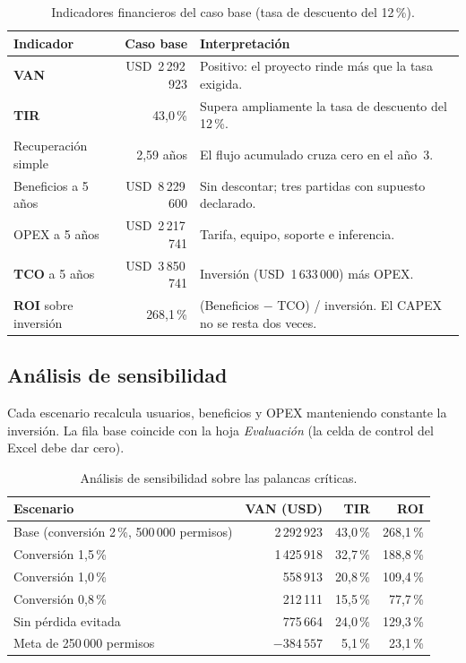 \documentclass[11pt,a4paper]{article}
\newcommand{\usd}[1]{USD~#1}
\begin{document}
\begin{table}[H]
\centering
\caption{Indicadores financieros del caso base (tasa de descuento del 12\,\%).}
\small
\begin{tabularx}{\textwidth}{@{}p{3.6cm} r X@{}}
\toprule
\textbf{Indicador} & \textbf{Caso base} & \textbf{Interpretación} \\
\midrule
\textbf{VAN} & \usd{2\,292\,923} & Positivo: el proyecto rinde más que la tasa exigida. \\
\textbf{TIR} & 43,0\,\% & Supera ampliamente la tasa de descuento del 12\,\%. \\
Recuperación simple & 2,59 años & El flujo acumulado cruza cero en el año~3. \\
Beneficios a 5 años & \usd{8\,229\,600} & Sin descontar; tres partidas con supuesto declarado. \\
OPEX a 5 años & \usd{2\,217\,741} & Tarifa, equipo, soporte e inferencia. \\
\textbf{TCO} a 5 años & \usd{3\,850\,741} & Inversión (\usd{1\,633\,000}) más OPEX. \\
\textbf{ROI} sobre inversión & 268,1\,\% & (Beneficios $-$ TCO) / inversión. El CAPEX no se resta dos veces. \\
\bottomrule
\end{tabularx}
\end{table}

\subsection{Análisis de sensibilidad}

Cada escenario recalcula usuarios, beneficios y OPEX manteniendo constante la inversión. La fila base coincide con la hoja \textit{Evaluación} (la celda de control del Excel debe dar cero).

\begin{table}[H]
\centering
\caption{Análisis de sensibilidad sobre las palancas críticas.}
\small
\begin{tabularx}{\textwidth}{@{}X r r r@{}}
\toprule
\textbf{Escenario} & \textbf{VAN (USD)} & \textbf{TIR} & \textbf{ROI} \\
\midrule
Base (conversión 2\,\%, 500\,000 permisos) & 2\,292\,923 & 43,0\,\% & 268,1\,\% \\
Conversión 1,5\,\%       & 1\,425\,918 & 32,7\,\% & 188,8\,\% \\
Conversión 1,0\,\%       & 558\,913    & 20,8\,\% & 109,4\,\% \\
Conversión 0,8\,\%       & 212\,111    & 15,5\,\% &  77,7\,\% \\
Sin pérdida evitada      & 775\,664    & 24,0\,\% & 129,3\,\% \\
\rowcolor{suave} Meta de 250\,000 permisos & $-384\,557$ & 5,1\,\% & 23,1\,\% \\
\bottomrule
\end{tabularx}
\end{table}
\end{document}

